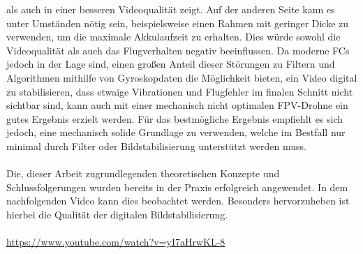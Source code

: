     als auch in einer besseren Videoqualität zeigt. Auf der anderen Seite kann es unter Umständen nötig sein,
    beispielsweise einen Rahmen mit geringer Dicke zu verwenden, um die maximale Akkulaufzeit zu erhalten.
    Dies würde sowohl die Videoqualität als auch das Flugverhalten negativ beeinflussen. Da moderne FCs
    jedoch in der Lage sind, einen großen Anteil dieser Störungen zu Filtern und Algorithmen mithilfe
    von Gyroskopdaten die Möglichkeit bieten, ein Video digital zu stabilisieren, dass etwaige Vibrationen
    und Flugfehler im finalen Schnitt nicht sichtbar sind, kann auch mit einer mechanisch nicht optimalen
    FPV-Drohne ein gutes Ergebnis erzielt werden. Für das bestmögliche Ergebnis empfiehlt es sich jedoch,
    eine mechanisch solide Grundlage zu verwenden, welche im Bestfall nur minimal durch Filter oder 
    Bildstabilisierung unterstützt werden muss. \\
    \\
    Die, dieser Arbeit zugrundlegenden theoretischen Konzepte und Schlussfolgerungen
    wurden bereits in der Praxis erfolgreich angewendet. In dem nachfolgenden Video kann dies beobachtet
    werden. Besonders hervorzuheben ist hierbei die Qualität der digitalen Bildstabilisierung. \\
    \\
    \href{https://www.youtube.com/watch?v=yI7aHrwKL-8}{https://www.youtube.com/watch?v=yI7aHrwKL-8}
